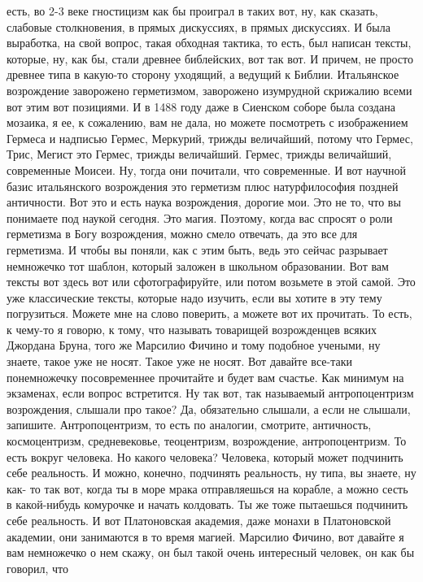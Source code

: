 есть, во 2-3 веке гностицизм как бы проиграл в таких вот, ну, как сказать,
слабовые столкновения, в прямых дискуссиях, в прямых дискуссиях. И была
выработка, на свой вопрос, такая обходная тактика, то есть, был написан тексты,
которые, ну, как бы, стали древнее библейских, вот так вот. И причем, не просто
древнее типа в какую-то сторону уходящий, а ведущий к Библии. Итальянское
возрождение заворожено герметизмом, заворожено изумрудной скрижалию всеми вот
этим вот позициями. И в 1488 году даже в Сиенском соборе была создана мозаика, я
ее, к сожалению, вам не дала, но можете посмотреть с изображением Гермеса и
надписью Гермес, Меркурий, трижды величайший, потому что Гермес, Трис, Мегист
это Гермес, трижды величайший. Гермес, трижды величайший, современные Моисеи.
Ну, тогда они почитали, что современные. И вот научной базис итальянского
возрождения это герметизм плюс натурфилософия поздней античности. Вот это и есть
наука возрождения, дорогие мои. Это не то, что вы понимаете под наукой сегодня.
Это магия. Поэтому, когда вас спросят о роли герметизма в Богу возрождения,
можно смело отвечать, да это все для герметизма. И чтобы вы поняли, как с этим
быть, ведь это сейчас разрывает немножечко тот шаблон, который заложен в
школьном образовании. Вот вам тексты вот здесь вот или сфотографируйте, или
потом возьмете в этой самой. Это уже классические тексты, которые надо изучить,
если вы хотите в эту тему погрузиться. Можете мне на слово поверить, а можете
вот их прочитать. То есть, к чему-то я говорю, к тому, что называть товарищей
возрожденцев всяких Джордана Бруна, того же Марсилио Фичино и тому подобное
учеными, ну знаете, такое уже не носят. Такое уже не носят. Вот давайте все-таки
понемножечку посовременнее прочитайте и будет вам счастье. Как минимум на
экзаменах, если вопрос встретится. Ну так вот, так называемый антропоцентризм
возрождения, слышали про такое? Да, обязательно слышали, а если не слышали,
запишите. Антропоцентризм, то есть по аналогии, смотрите, античность,
космоцентризм, средневековье, теоцентризм, возрождение, антропоцентризм. То есть
вокруг человека. Но какого человека? Человека, который может подчинить себе
реальность. И можно, конечно, подчинять реальность, ну типа, вы знаете, ну как-
то так вот, когда ты в море мрака отправляешься на корабле, а можно сесть в
какой-нибудь комурочке и начать колдовать. Ты же тоже пытаешься подчинить себе
реальность. И вот Платоновская академия, даже монахи в Платоновской академии,
они занимаются в то время магией. Марсилио Фичино, вот давайте я вам немножечко
о нем скажу, он был такой очень интересный человек, он как бы говорил, что
